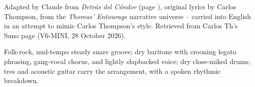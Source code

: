 
\label{sec:behind-the-condor}
\begin{notes}
Adapted by Claude from \emph{Detrás del Cóndor} (page \pageref{sec:detras-del-condor}), original lyrics by Carlos Thompson, from the \emph{Thomas' Entourage} narrative universe -- carried into English in an attempt to mimic Carlos Thompson's style. Retrieved from Carlos Th's Suno page (V6-MINI, 28 October 2026).
\end{notes}
\begin{style}
Folk-rock, mid-tempo steady snare groove; dry baritone with crooning legato phrasing, gang-vocal chorus, and lightly slapbacked voice; dry close-miked drums; tres and acoustic guitar carry the arrangement, with a spoken rhythmic breakdown.
\end{style}
